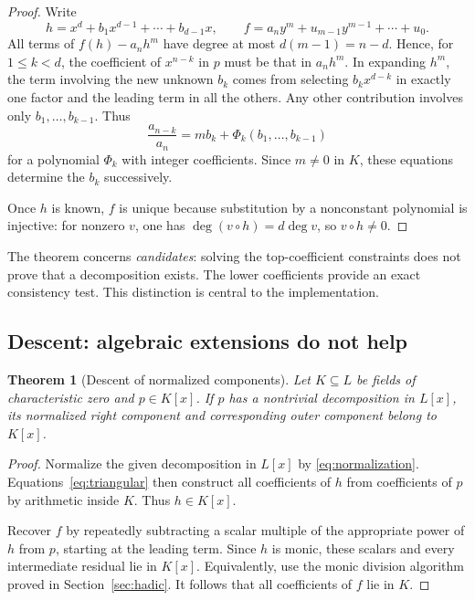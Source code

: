 \documentclass[11pt,letterpaper]{article}
\newtheorem{theorem}{Theorem}[section]
\theoremstyle{definition}
\theoremstyle{remark}
\begin{document}
\begin{proof}
Write
\[
 h=x^d+b_1x^{d-1}+\cdots+b_{d-1}x,
 \qquad f=a_n y^m+u_{m-1}y^{m-1}+\cdots+u_0.
\]
All terms of $f(h)-a_nh^m$ have degree at most $d(m-1)=n-d$.
Hence, for $1\leq k<d$, the coefficient of $x^{n-k}$ in $p$ must be
that in $a_nh^m$. In expanding $h^m$, the term involving the new unknown
$b_k$ comes from selecting $b_kx^{d-k}$ in exactly one factor and the
leading term in all the others. Any other contribution involves only
$b_1,\ldots,b_{k-1}$. Thus
\begin{equation}\label{eq:triangular}
 \frac{a_{n-k}}{a_n}=m b_k+
 \Phi_k(b_1,\ldots,b_{k-1})
\end{equation}
for a polynomial $\Phi_k$ with integer coefficients. Since $m\ne0$ in
$K$, these equations determine the $b_k$ successively.

Once $h$ is known, $f$ is unique because substitution by a nonconstant
polynomial is injective: for nonzero $v$, one has
$\deg(v\circ h)=d\deg v$, so $v\circ h\ne0$.
\end{proof}

The theorem concerns \emph{candidates}: solving the top-coefficient
constraints does not prove that a decomposition exists. The lower
coefficients provide an exact consistency test. This distinction is
central to the implementation.

\subsection{Descent: algebraic extensions do not help}

\begin{theorem}[Descent of normalized components]\label{thm:descent}
Let $K\subseteq L$ be fields of characteristic zero and $p\in K[x]$.
If $p$ has a nontrivial decomposition in $L[x]$, its normalized right
component and corresponding outer component belong to $K[x]$.
\end{theorem}

\begin{proof}
Normalize the given decomposition in $L[x]$ by
\eqref{eq:normalization}. Equations~\eqref{eq:triangular} then construct
all coefficients of $h$ from coefficients of $p$ by arithmetic inside
$K$. Thus $h\in K[x]$.

Recover $f$ by repeatedly subtracting a scalar multiple of the appropriate
power of $h$ from $p$, starting at the leading term. Since $h$ is monic,
these scalars and every intermediate residual lie in $K[x]$. Equivalently,
use the monic division algorithm proved in Section~\ref{sec:hadic}.
It follows that all coefficients of $f$ lie in $K$.
\end{proof}
\end{document}
